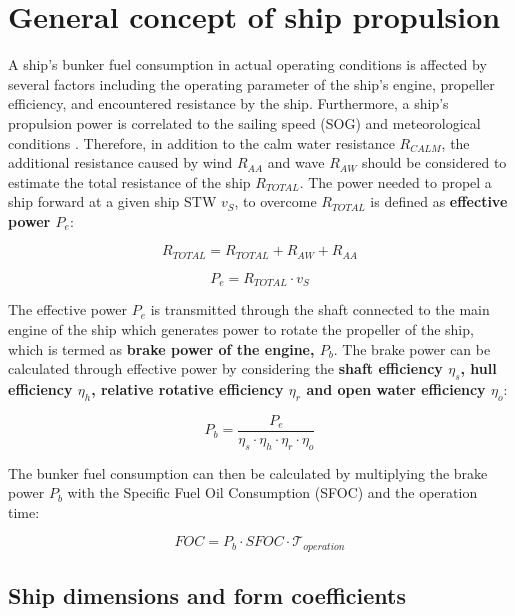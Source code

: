\section{General concept of ship propulsion}\label{sec:power_calc}

A ship's bunker fuel consumption in actual operating conditions is affected by several factors including the operating parameter of the ship's engine, propeller efficiency, and encountered resistance by the ship. Furthermore, a ship's propulsion power is correlated to the sailing speed (SOG) and meteorological conditions . Therefore, in addition to the calm water resistance $R_{CALM}$, the additional resistance caused by wind $R_{AA}$ and wave $R_{AW}$ should be considered to estimate the total resistance of the ship $R_{TOTAL}$. The power needed to propel a ship forward at a given ship STW $v_S$, to overcome $R_{TOTAL}$ is defined as \textbf{effective power $P_e$}:

\begin{equation}\label{eqn:R_tot}
    R_{TOTAL} = R_{TOTAL} + R_{AW} + R_{AA} 
\end{equation}

\begin{equation}\label{eqn:P_e}
    P_e = R_{TOTAL}\cdot v_{S}
\end{equation}

The effective power $P_e$ is transmitted through the shaft connected to the main engine of the ship which generates power to rotate the propeller of the ship, which is termed as \textbf{brake power of the engine, $P_b$}. The brake power can be calculated through effective power by considering the \textbf{shaft efficiency $\eta_s$, hull efficiency $\eta_h$, relative rotative efficiency $\eta_r$ and open water efficiency $\eta_o$}:

\begin{equation}\label{eqn:P_b}
    P_b = \frac{P_e}{\eta_s\cdot\eta_h\cdot\eta_r\cdot\eta_o}
\end{equation}

The bunker fuel consumption can then be calculated by multiplying the brake power $P_b$ with the Specific Fuel Oil Consumption (SFOC) and the operation time:

\begin{equation}\label{eqn:FOC}
    FOC = P_b\cdot SFOC\cdot \mathcal{T}_{operation} 
\end{equation}

\subsection{Ship dimensions and form coefficients}\label{sec:Ship_design_param}

